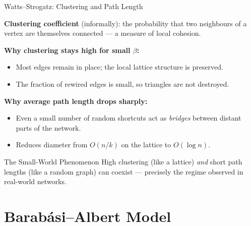 \documentclass[t]{beamer}
\begin{document}
\begin{frame}{Watts--Strogatz: Clustering and Path Length}

\textbf{Clustering coefficient} (informally): the probability that two neighbours
of a vertex are themselves connected — a measure of local cohesion.

\medskip

\textbf{Why clustering stays high for small $\beta$:}
\begin{itemize}
  \item Most edges remain in place; the local lattice structure is preserved.
  \item The fraction of rewired edges is small, so triangles are not destroyed.
\end{itemize}

\medskip

\textbf{Why average path length drops sharply:}
\begin{itemize}
  \item Even a small number of random shortcuts act as \emph{bridges} between
        distant parts of the network.
  \item Reduces diameter from $O(n/k)$ on the lattice to $O(\log n)$.
\end{itemize}

\begin{alertblock}{The Small-World Phenomenon}
  High clustering (like a lattice) \emph{and} short path lengths (like a random graph)
  can coexist — precisely the regime observed in real-world networks.
\end{alertblock}

\end{frame}

\section{Barab\'{a}si--Albert Model}
\end{document}

